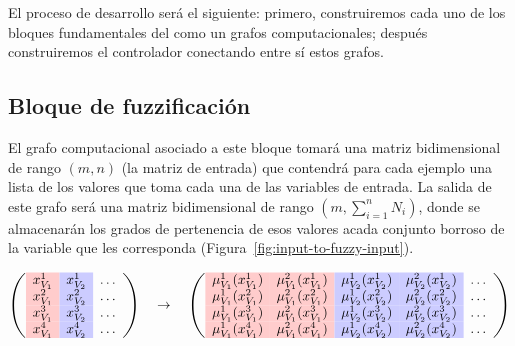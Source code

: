 El proceso de desarrollo será el siguiente: primero, construiremos cada uno de los bloques fundamentales del  como un grafos computacionales; después construiremos el controlador conectando entre sí estos grafos.

\subsection{Bloque de fuzzificación}

El grafo computacional asociado a este bloque tomará una matriz bidimensional de rango $(m, n)$ (la matriz de entrada) que contendrá para cada ejemplo una lista de los valores que toma cada una de las variables de entrada. La salida de este grafo será una matriz bidimensional de rango $(m, \sum_{i=1}^n N_i)$, donde se almacenarán los grados de pertenencia de esos valores acada conjunto borroso de la variable que les corresponda (Figura~\ref{fig:input-to-fuzzy-input}).

\begin{figure*}
	\centering
	\begin{equation*}
		\left(\begin{array}{>{\columncolor{red!20}}c>{\columncolor{blue!20}}cc}
		x^1_{V_1} & x^1_{V_2} & \ldots \\
		x^2_{V_1} & x^2_{V_2} & \ldots \\
		x^3_{V_1} & x^3_{V_2} & \ldots \\
		x^4_{V_1} & x^4_{V_2} & \ldots \\
		\end{array}\right)
		\quad \rightarrow \quad 
		\left(\begin{array}{>{\columncolor{red!20}}c>{\columncolor{red!20}}c>{\columncolor{blue!20}}c>{\columncolor{blue!20}}cc}
		\mu^1_{V_1}(x^1_{V_1}) & \mu^2_{V_1}(x^1_{V_1}) & \mu^1_{V_2}(x^1_{V_2}) & \mu^2_{V_2}(x^1_{V_2}) & \ldots \\
		\mu^1_{V_1}(x^2_{V_1}) & \mu^2_{V_1}(x^2_{V_1}) & \mu^1_{V_2}(x^2_{V_2}) & \mu^2_{V_2}(x^2_{V_2}) & \ldots \\
		\mu^1_{V_1}(x^3_{V_1}) & \mu^2_{V_1}(x^3_{V_1}) & \mu^1_{V_2}(x^3_{V_2}) & \mu^2_{V_2}(x^3_{V_2}) & \ldots \\
		\mu^1_{V_1}(x^4_{V_1}) & \mu^2_{V_1}(x^4_{V_1}) & \mu^1_{V_2}(x^4_{V_2}) & \mu^2_{V_2}(x^4_{V_2}) & \ldots \\
		\end{array}\right)
	\end{equation*}
	\caption[Ejemplo de operación en el bloque de fuzzificación]{El bloque de fuzzificación transformará los valores de sus respectivos dominios al de cada conjunto borroso. La matriz generada tendrá tantas columnas como conjuntos borrosos posee cada variable.}
	\label{fig:input-to-fuzzy-input}
\end{figure*}

